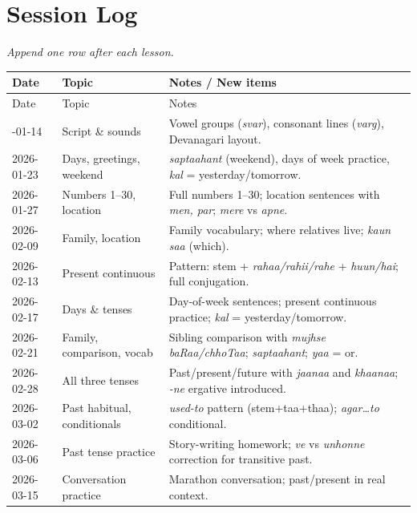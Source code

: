 \clearpage
\section{Session Log}

\textit{Append one row after each lesson.}

\begin{longtable}{@{}p{2.4cm} p{3.8cm} p{8cm}@{}}
  \toprule
  Date & Topic & Notes / New items \\
  \midrule
  \endfirsthead
  \toprule
  Date & Topic & Notes \\
  \midrule
  \endhead
  \bottomrule
  \endfoot
  2026-01-14 & Script \& sounds & Vowel groups (\textit{svar}), consonant lines (\textit{varg}), Devanagari layout. \\[4pt]
  2026-01-23 & Days, greetings, weekend & \textit{saptaahant} (weekend), days of week practice, \textit{kal} = yesterday/tomorrow. \\[4pt]
  2026-01-27 & Numbers 1--30, location & Full numbers 1--30; location sentences with \textit{men, par}; \textit{mere} vs \textit{apne}. \\[4pt]
  2026-02-09 & Family, location & Family vocabulary; where relatives live; \textit{kaun saa} (which). \\[4pt]
  2026-02-13 & Present continuous & Pattern: stem + \textit{rahaa/rahii/rahe} + \textit{huun/hai}; full conjugation. \\[4pt]
  2026-02-17 & Days \& tenses & Day-of-week sentences; present continuous practice; \textit{kal} = yesterday/tomorrow. \\[4pt]
  2026-02-21 & Family, comparison, vocab & Sibling comparison with \textit{mujhse baRaa/chhoTaa}; \textit{saptaahant}; \textit{yaa} = or. \\[4pt]
  2026-02-28 & All three tenses & Past/present/future with \textit{jaanaa} and \textit{khaanaa}; \textit{-ne} ergative introduced. \\[4pt]
  2026-03-02 & Past habitual, conditionals & \textit{used-to} pattern (stem+taa+thaa); \textit{agar\ldots to} conditional. \\[4pt]
  2026-03-06 & Past tense practice & Story-writing homework; \textit{ve} vs \textit{unhonne} correction for transitive past. \\[4pt]
  2026-03-15 & Conversation practice & Marathon conversation; past/present in real context. \\[4pt]

\end{longtable}
